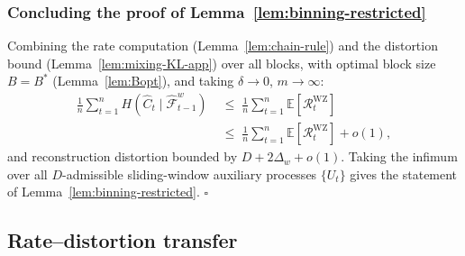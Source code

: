 \documentclass[11pt]{article}
\newcommand{\E}{\mathbb{E}}
\newcommand{\F}{\mathcal{F}}
\newcommand{\Fhat}{\hat{\F}}
\newcommand{\Chat}{\hat{C}}
\theoremstyle{plain}
\theoremstyle{definition}
\theoremstyle{remark}
\begin{document}
\subsubsection{Concluding the proof of Lemma~\ref{lem:binning-restricted}}
\label{app:binning-conclude}

Combining the rate computation (Lemma~\ref{lem:chain-rule}) and the
distortion bound (Lemma~\ref{lem:mixing-KL-app}) over all blocks, with
optimal block size $B = B^*$ (Lemma~\ref{lem:Bopt}), and taking
$\delta \to 0$, $m \to \infty$:
\[
\begin{split}
\frac{1}{n}\sum_{t=1}^n H(\Chat_t \mid \Fhat_{t-1}^w)
&\;\leq\;
\frac{1}{n}\sum_{t=1}^n \E[\mathcal{R}_t^{\mathrm{WZ}}]\\
&\;\leq\;
\frac{1}{n}\sum_{t=1}^n \E[\mathcal{R}_t^{\mathrm{WZ}}]
+ o(1),
\end{split}
\]
and reconstruction distortion bounded by
$D + 2\Delta_w + o(1)$. Taking the infimum over all $D$-admissible
sliding-window auxiliary processes $\{U_t\}$ gives the statement of
Lemma~\ref{lem:binning-restricted}. \hfill$\square$

\subsection{Rate--distortion transfer}\label{app:rdt-transfer}
\end{document}
